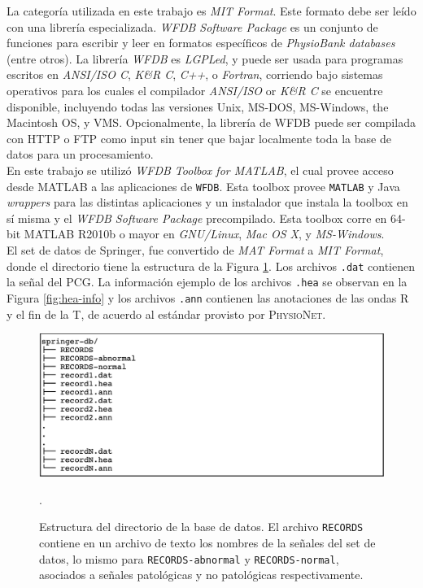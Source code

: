 \indent La categoría utilizada en este trabajo es \textit{MIT Format}. Este formato debe ser leído con una librería especializada. \textit{WFDB Software Package} es un conjunto de funciones para escribir y leer en formatos específicos de \textit{PhysioBank databases} (entre otros). La librería \textit{WFDB} es \textit{LGPLed}, y puede ser usada para programas escritos en \textit{ANSI/ISO C}, \textit{K\&R C}, \textit{C++}, o \textit{Fortran}, corriendo bajo sistemas operativos para los cuales el compilador \textit{ANSI/ISO} or \textit{K\&R C} se encuentre disponible, incluyendo todas las versiones Unix, MS-DOS, MS-Windows, the Macintosh OS, y VMS. Opcionalmente, la librería de WFDB puede ser compilada con HTTP o FTP como input sin tener que bajar localmente toda la base de datos para un procesamiento. \\
\indent En este trabajo se utilizó \textit{WFDB Toolbox for MATLAB\texttrademark}, el cual provee acceso desde \textsc{MATLAB} a las aplicaciones de \texttt{WFDB}. Esta toolbox provee \texttt{MATLAB\texttrademark} y Java \textit{wrappers} para las distintas aplicaciones y un instalador que instala la toolbox en sí misma y el \textit{WFDB Software Package} precompilado. Esta toolbox corre en 64-bit \textsc{MATLAB\texttrademark} R2010b o mayor en \textit{GNU/Linux}, \textit{Mac OS X}, y \textit{MS-Windows}. \\
\indent El set de datos de Springer, fue convertido de \textit{MAT Format} a \textit{MIT Format}, donde el directorio tiene la estructura de la Figura \ref{fig:springer-db}. Los archivos \texttt{.dat} contienen la señal del PCG. La información ejemplo de los archivos \texttt{.hea} se observan en la Figura \ref{fig:hea-info} y los archivos \texttt{.ann} contienen las anotaciones de las ondas R y el fin de la T, de acuerdo al estándar provisto por \textsc{PhysioNet}.

\begin{figure}[H]
    \centering
    \includegraphics[scale=0.73]{sections/chapter-03/images/springer-db.png}
    \caption[Estructura del directorio de la base de datos.]{Estructura del directorio de la base de datos. El archivo \texttt{RECORDS} contiene en un archivo de texto los nombres de la señales del set de datos, lo mismo para \texttt{RECORDS-abnormal} y \texttt{RECORDS-normal}, asociados a señales patológicas y no patológicas respectivamente.}.
    \label{fig:springer-db}
\end{figure}


